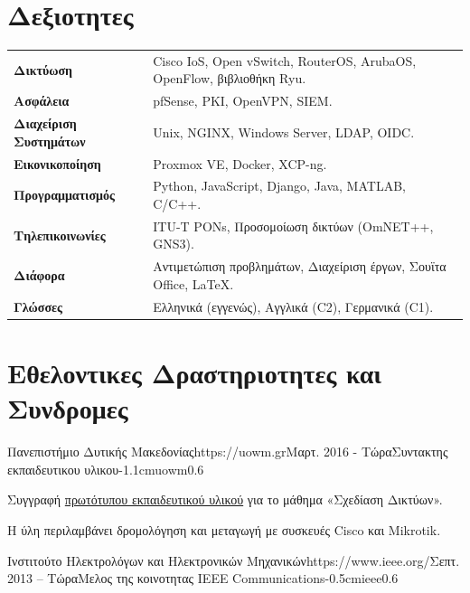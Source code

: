 \documentclass{mycv}
\begin{document}
	\section{Δεξιοτητες}
	\begin{tabular}{m{4.5cm} m{13cm}}\renewcommand{\arraystretch}{2}
		\textbf{Δικτύωση}   			& Cisco IoS, Open vSwitch, RouterOS, ArubaOS, OpenFlow, βιβλιοθήκη Ryu.\\
		\textbf{Ασφάλεια}				& pfSense, PKI, OpenVPN, SIEM. \\
		\textbf{Διαχείριση Συστημάτων}	& Unix, NGINX, Windows Server, LDAP, OIDC. \\
		\textbf{Εικονικοποίηση}			& Proxmox VE, Docker, XCP-ng.\\ 
		\textbf{Προγραμματισμός} 	    & Python, JavaScript, Django, Java, MATLAB, C/C++. \\
		\textbf{Τηλεπικοινωνίες}   		& ITU-T PONs, Προσομοίωση δικτύων (OmNET++, GNS3). \\
		\textbf{Διάφορα}				& Αντιμετώπιση προβλημάτων, Διαχείριση έργων, Σουϊτα Office, \LaTeX. \\
		\textbf{Γλώσσες} 				& Ελληνικά (εγγενώς), Αγγλικά (C2), Γερμανικά (C1). 
	\end{tabular}

	\section{Εθελοντικες Δραστηριοτητες και Συνδρομες}
	\vspace*{0.125cm}	
	\begin{EntryDatedLogo}{Πανεπιστήμιο Δυτικής Μακεδονίας}{https://uowm.gr}{Μαρτ. 2016 - Τώρα}{Συντακτης εκπαιδευτικου υλικου}{-1.1cm}{uowm}{0.6}
		\begin{Itemize}
			\item Συγγραφή \href{https://github.com/cdalamagkas/network-design-labs}{πρωτότυπου εκπαιδευτικού υλικού} για το μάθημα «Σχεδίαση Δικτύων».
			\item Η ύλη περιλαμβάνει δρομολόγηση και μεταγωγή με συσκευές Cisco και Mikrotik.
		\end{Itemize}
	\end{EntryDatedLogo}
	
	\vspace*{0.5cm}
	
	\begin{EntryDatedLogo}{Ινστιτούτο Ηλεκτρολόγων και Ηλεκτρονικών Μηχανικών}{https://www.ieee.org/}{Σεπτ. 2013 -- Τώρα}{Μελος της κοινοτητας IEEE Communications}{-0.5cm}{ieee}{0.6}
	\end{EntryDatedLogo}
	
\end{document}
